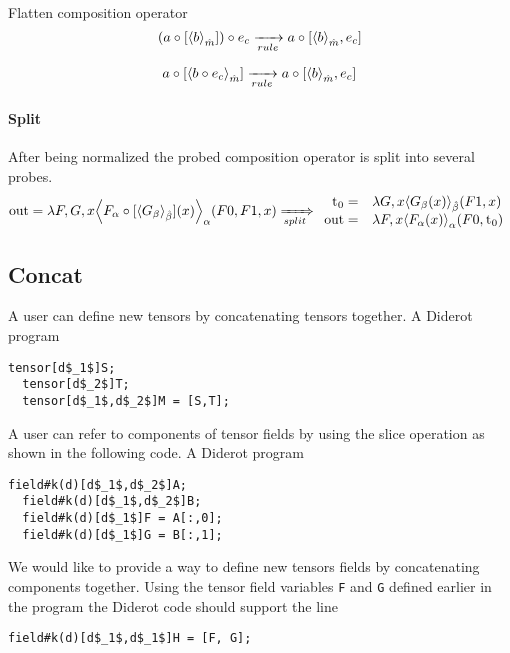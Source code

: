 \documentclass{article}
\begin{document}
Flatten composition operator
$$ \expCompSingle{ (\expComp{a}{b}{m})}{c}{n} 
\rewriteRule{}
\expCompList{a}{b}{m}
$$

$$ \expComp{a}{\expCompSingle{b}{c}{n}}{m} 
\rewriteRule{}
\expCompList{a}{b}{m}
$$



\paragraph{Split}
After being normalized the probed composition operator is split into several probes.
$$
\text{\lstinline!out!} = \lambda F,G,x \EinExp{\expComp{F_\alpha}{G_\beta}{\beta}(x)}{\alpha}(F0, F1, x)
\rewriteSplit{}
\begin{array}{rl}
\lstinline!t!_0 = & \lambda G,x\EinExp{G_\beta(x)}{\hat{\beta}}(F1,x)\\
\text{\lstinline!out!}= & \lambda F,x \EinExp{F_\alpha(x)}{\alpha}(F0, \lstinline!t!_0)
 \end{array}$$
 
  \subsection{Concat}
A user can define new tensors by concatenating tensors together.
A Diderot program
\begin{lstlisting}[mathescape=true]
  tensor[d$_1$]S; 
  tensor[d$_2$]T;
  tensor[d$_1$,d$_2$]M = [S,T]; 
\end{lstlisting}

A user can refer to components of tensor fields by using the slice operation as shown in the following code.
A Diderot program
\begin{lstlisting}[mathescape=true]
  field#k(d)[d$_1$,d$_2$]A; 
  field#k(d)[d$_1$,d$_2$]B;
  field#k(d)[d$_1$]F = A[:,0]; 
  field#k(d)[d$_1$]G = B[:,1];
\end{lstlisting}

We would like to provide a way to define new tensors fields by concatenating components together.
Using the tensor field variables \lstinline!F! and  \lstinline!G! defined earlier in the program the Diderot code should support the line 
\begin{lstlisting}[mathescape=true]
  field#k(d)[d$_1$,d$_1$]H = [F, G];
\end{lstlisting}
\end{document}
